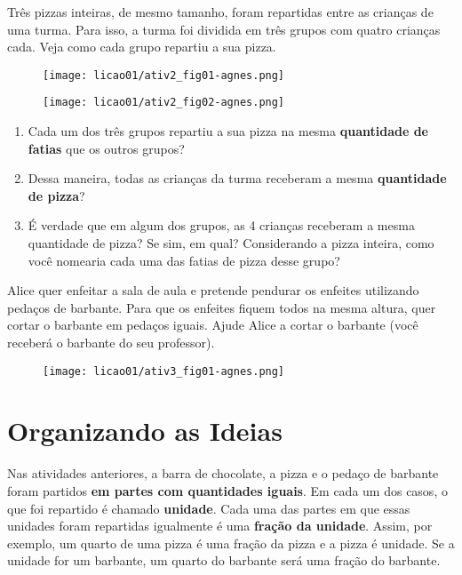 \begin{atividade}{}\label{chap1-ativ2}
Três pizzas inteiras, de mesmo tamanho, foram repartidas entre as crianças de uma turma. Para isso, a turma foi dividida em três grupos com quatro crianças cada. Veja como cada grupo repartiu a sua pizza.

\begin{figure}[H]
\centering

\texttt{[image: licao01/ativ2\_fig01-agnes.png]}

\texttt{[image: licao01/ativ2\_fig02-agnes.png]}
\end{figure}

\begin{enumerate} %
\item Cada um dos três grupos repartiu a sua pizza na mesma \textbf{quantidade de fatias} que os outros grupos?
\item Dessa maneira, todas as crianças da turma receberam a mesma \textbf{quantidade de pizza}?
\item É verdade que em algum dos grupos, as 4 crianças receberam a mesma quantidade de pizza? Se sim, em qual? Considerando a pizza inteira, como você nomearia cada uma das fatias de pizza desse grupo?
\end{enumerate} %

\end{atividade}

\begin{atividade}{}\label{chap1-ativ3}


Alice quer enfeitar a sala de aula e pretende pendurar os enfeites utilizando pedaços de barbante. Para que os enfeites fiquem todos na mesma altura, quer cortar o barbante em pedaços iguais. Ajude Alice a cortar o barbante (você receberá o barbante do seu professor).


\begin{figure}[H]
\centering

\texttt{[image: licao01/ativ3\_fig01-agnes.png]}
\end{figure}


\end{atividade}

\section{Organizando as Ideias}

Nas atividades anteriores, a barra de chocolate, a pizza e o pedaço de barbante foram partidos \textbf{em partes com quantidades iguais}.
Em cada um dos casos, o que foi repartido é chamado \textbf{unidade}. Cada uma das partes em que essas unidades foram repartidas igualmente é uma \textbf{fração da unidade}. Assim, por exemplo, um quarto de uma pizza é uma fração da pizza e a pizza é unidade. Se a unidade for um barbante, um quarto do barbante será uma fração do barbante.


